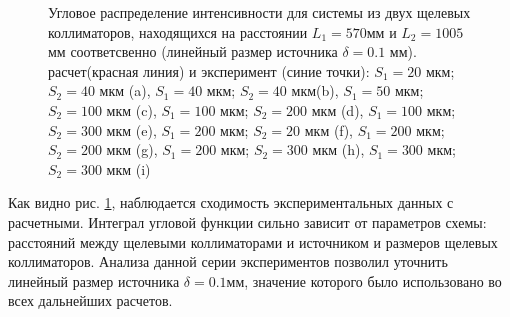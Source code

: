 \begin{figure}[H]
  \hfill
  \hfill
  \hfill
  \caption{Угловое распределение интенсивности для системы из двух щелевых коллиматоров, находящихся
  на расстоянии $L_1= 570 $мм и $L_2 = 1005$ мм соответсвенно (линейный размер источника $\delta = 0.1$ мм).
  расчет(красная линия) и эксперимент (синие точки):
  $S_1 = 20$ мкм; $S_2 = 40$ мкм (a),
  $S_1 = 40$ мкм; $S_2 = 40$ мкм(b), $S_1 = 50$ мкм; $S_2 = 100$ мкм (c),
   $S_1 = 100$ мкм; $S_2 = 200$ мкм (d),  $S_1 = 100$ мкм; $S_2 = 300$ мкм (e),
    $S_1 = 200$ мкм; $S_2 = 20$ мкм (f),  $S_1 = 200$ мкм; $S_2 = 200$ мкм (g),
    $S_1 = 200$ мкм; $S_2 = 300$ мкм (h),  $S_1 = 300$ мкм; $S_2 = 300$ мкм (i)}
  \label{ris:zero_exp}
\end{figure}

Как видно рис. \ref{ris:zero_exp}, наблюдается сходимость экспериментальных данных с расчетными.
Интеграл угловой функции сильно зависит от параметров схемы: расстояний между щелевыми коллиматорами и источником и
размеров щелевых коллиматоров. Анализа данной серии экспериментов позволил уточнить линейный размер источника $\delta = 0.1$мм,
значение которого было использовано во всех дальнейших расчетов.
